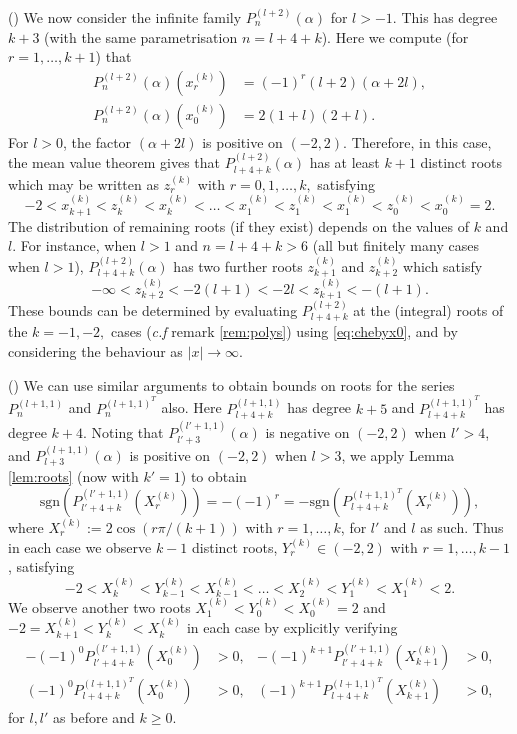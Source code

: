 \documentclass{article}
\theoremstyle{definition}
\newcommand{\mdef}{\refstepcounter{theorem}       \medskip \noindent ({\bf \thetheorem}) }
\def\a{\alpha}
\numberwithin{equation}{subsection}
\begin{document}
\mdef We now consider the infinite family $P_n^{(l+2)}(\a)$ for $l>-1$. This has degree $k+3$ (with the same parametrisation $n=l+4+k$). Here we compute (for $r=1,\dots, k+1$) that
\begin{align*}
    P_n^{(l+2)}(\a)(x_r^{(k)})&=(-1)^r(l+2)(\a+2 l),\\
    P_n^{(l+2)}(\a)(x_0^{(k)})&=2 (1 + l) (2 + l). 
\end{align*}
For $l>0$, the factor $(\a+2 l)$ is positive on $(-2,2)$. Therefore, in this case, the mean value theorem gives that $P_{l+4+k}^{(l+2)}(\a)$ has at least $k+1$ distinct roots which may be written as $z^{(k)}_{r}$ with $r=0,1,\dots,k,$ satisfying
\[-2<x_{k+1}^{(k)}<z_k^{(k)}<x_{k}^{(k)}< \dots<x_1^{(k)}<z^{(k)}_{1}<x_1^{(k)}<z^{(k)}_{0}<x_0^{(k)}=2.\]
The distribution of remaining roots (if they exist) depends on the values of $k$ and $l$. For instance, when $l>1$ and $n=l+4+k>6$ (all but finitely many cases when $l>1$), $P_{l+4+k}^{(l+2)}(\a)$ has two further roots $z^{(k)}_{k+1}$ and $z^{(k)}_{k+2}$ which satisfy
\[-\infty< z^{(k)}_{k+2}<- 2 (l+1) <- 2 l <z^{(k)}_{k+1}<-(l+1).\]
These bounds can be determined by evaluating $P_{l+4+k}^{(l+2)}$ at the (integral) roots of the $k=-1,-2,$ cases (\textit{c.f} remark \ref{rem:polys}) using \eqref{eq:chebyx0}, and by considering the behaviour as $|x|\to \infty$.

\mdef We can use similar arguments to obtain bounds on roots for the series $P^{(l+1,1)}_{n}$ and $P^{(l+1,1)^T}_{n}$ also. Here $P^{(l+1,1)}_{l+4+k}$ has degree $k+5$ and $P^{(l+1,1)^T}_{l+4+k}$ has degree $k+4$. Noting that $P^{(l'+1,1)}_{l'+3}(\a)$ is negative on $(-2,2)$ when $l'>4$, and $P^{(l+1,1)}_{l+3}(\a)$ is positive on $(-2,2)$ when $l>3$, we apply Lemma \ref{lem:roots} (now with $k'=1$) to obtain 
\[
    \text{sgn}(P^{(l'+1,1)}_{l'+4+k}(X_r^{(k)}))=-(-1)^r=
    -\text{sgn}(P^{(l+1,1)^T}_{l+4+k}(X_r^{(k)})),
\]  
where $X_r^{(k)}:=2\cos(r \pi/(k+1))$ with $r=1,\dots,k$, for $l'$ and $l$ as such. Thus in each case we observe $k-1$ distinct roots, $Y_r^{(k)}\in (-2,2)$ with $r=1,\dots,k-1$, satisfying
\[-2<X_{k}^{(k)}<Y_{k-1}^{(k)}<X_{k-1}^{(k)}< \dots<X_2^{(k)}<Y^{(k)}_{1}<X_1^{(k)}<2.\]
We observe another two roots $X_1^{(k)}<Y_0^{(k)}<X_{0}^{(k)}=2$ and $-2=X_{k+1}^{(k)}<Y_{k}^{(k)}<X_{k}^{(k)}$ in each case by explicitly verifying
\begin{align*}
    -(-1)^0P^{(l'+1,1)}_{l'+4+k}(X_0^{(k)})&>0, &
    -(-1)^{k+1} P^{(l'+1,1)}_{l'+4+k}(X_{k+1}^{(k)})&>0,\\
    (-1)^{0} P^{(l+1,1)^T}_{l+4+k}(X_{0}^{(k)})&>0, &
    (-1)^{k+1} P^{(l+1,1)^T}_{l+4+k}(X_{k+1}^{(k)})&>0,
\end{align*}
for $l,l'$ as before and $k\geq 0$. 
\end{document}
